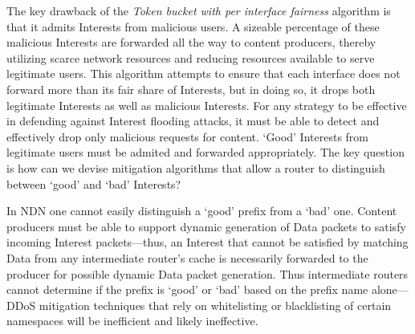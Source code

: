 


The key drawback of the {\it Token bucket with per interface fairness} algorithm is that it admits Interests from malicious users. A sizeable percentage of these malicious Interests are forwarded all the way to content producers, thereby utilizing scarce network resources and reducing resources available to serve legitimate users.  This algorithm attempts to ensure that each interface does not forward more than its fair share of Interests, but in doing so, it drops both legitimate Interests as well as malicious Interests. For any strategy to be effective in defending against Interest flooding attacks, it must be able to detect and effectively drop only malicious requests for content. `Good' Interests from legitimate users must be admited and forwarded appropriately. The key question is how can we devise mitigation algorithms that allow a router to distinguish between `good' and `bad' Interests? 


  
In NDN one cannot easily distinguish a `good' prefix from a `bad' one. Content producers must be able to support dynamic generation of Data packets to satisfy incoming Interest packets---thus, an Interest that cannot be satisfied by matching Data from any intermediate router's cache is necessarily forwarded to the producer for possible dynamic Data packet generation. 
Thus intermediate routers cannot determine if the prefix is `good' or `bad' based on the prefix name alone---DDoS mitigation techniques that rely on whitelisting or blacklisting of certain namespaces  will be inefficient and likely ineffective. 

